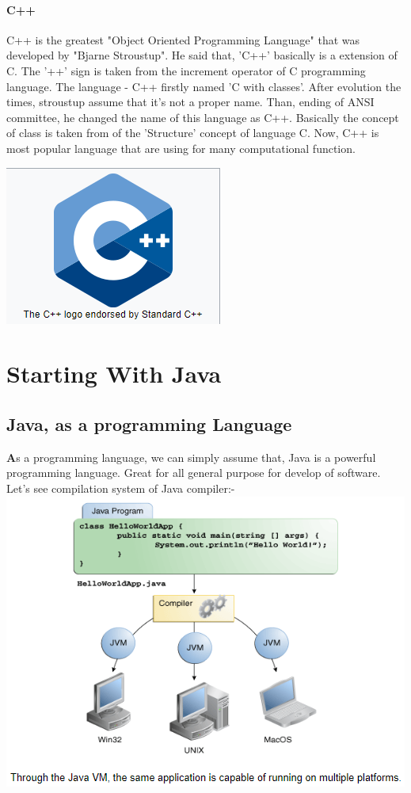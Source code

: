 \documentclass[paper = A5, headinclude, parskip = full, oneside, font = 11 pt]{report}
\begin{document}
\subsubsection{C++}
C++ is the greatest "Object Oriented Programming Language" that was developed by "Bjarne Stroustup". He said that, 'C++' basically is a extension of C. The '++' sign is taken from the increment operator of C programming language. The language - C++ firstly named 'C with classes'. After evolution the times, stroustup assume that it's not a proper name. Than, ending of ANSI committee, he changed the name of this language as C++. Basically the concept of class is taken from of the 'Structure' concept of language C. Now, C++ is most popular language that are using for many computational function.
\begin{center}
 \includegraphics[width = 140 pt]{C++ Logo.png}
\end{center}

\chapter{Starting With Java}

\color{green}
\section{Java, as a programming Language}

\color{black}
\textbf{A}s a programming language, we can simply assume that, Java is a powerful programming language. Great for all general purpose for develop of software.
Let's see compilation system of Java compiler:-
\\
\includegraphics[width = 230 pt]{Compilation system.png}
\end{document}
